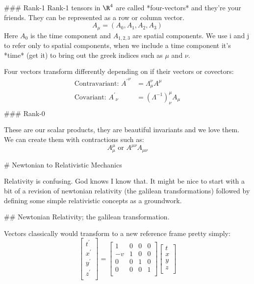 ### Rank-1
Rank-1 tensors in $\R^4$ are called *four-vectors* and they're your friends. They can be represented as a row or column vector.
$$
A_\mu = (A_0, A_1, A_2, A_3)
$$
Here $A_0$ is the time component and $A_{1,2,3}$ are spatial components. We use i and j to refer only to spatial components, when we include a time component it's *time* (get it) to bring out the greek indices such as $\mu$ and $\nu$. 

Four vectors transform differently depending on if their vectors or covectors:
$$
\begin{aligned}
    \text{Contravariant: } {A^{\prime}}^\nu &= \Lambda^\nu_\mu A^\mu\\
    \text{Covariant: } {A^{\prime}}_\nu &= (\Lambda^{-1})_\nu^\mu A_\mu\\
\end{aligned}
$$
### Rank-0

These are our scalar products, they are beautiful invariants and we love them. We can create them with contractions such as:
$$
A^\mu_\mu \text{ or } A^{\mu\nu}A_{\mu\nu}
$$

# Newtonian to Relativistic Mechanics

Relativity is confusing. God knows I know that. It might be nice to start with a bit of a revision of newtonian relativity (the galilean transformations) followed by defining some simple relativistic concepts as a groundwork.

## Newtonian Relativity; the galilean transformation.

Vectors classically would transform to a new reference frame pretty simply:
$$
\begin{bmatrix}
    t^\prime\\
    x^\prime\\
    y^\prime\\
    z^\prime\\
\end{bmatrix}

=
\begin{bmatrix}
    1  & 0 & 0 & 0\\
    -v & 1 & 0 & 0\\
    0  & 0 & 1 & 0\\
    0  & 0 & 0 & 1\\
\end{bmatrix}
\begin{bmatrix}
    t\\
    x\\
    y\\
    z\\
\end{bmatrix}
$$

